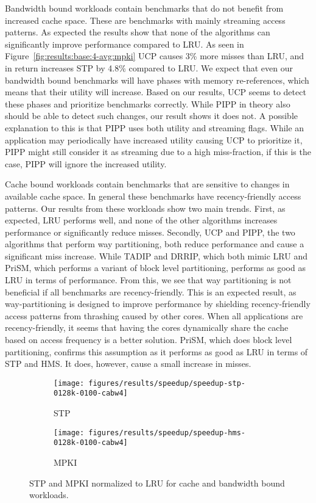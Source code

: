 Bandwidth bound workloads contain benchmarks that do not benefit from increased cache space.
These are benchmarks with mainly streaming access patterns. 
As expected the results show that none of the algorithms can significantly improve performance compared to LRU.
As seen in Figure~\ref{fig:results:base:4-avg:mpki} UCP causes 3\% more misses than LRU, and in return increases STP by 4.8\% compared to LRU.
We expect that even our bandwidth bound benchmarks will have phases with memory re-references, which means that their utility will increase.
Based on our results, UCP seems to detect these phases and prioritize benchmarks correctly.
While PIPP in theory also should be able to detect such changes, our result shows it does not.
A possible explanation to this is that PIPP uses both utility and streaming flags.
While an application may periodically have increased utility causing UCP to prioritize it, PIPP might still consider it as streaming due to a high miss-fraction, if this is the case, PIPP will ignore the increased utility.

Cache bound workloads contain benchmarks that are sensitive to changes in available cache space.
In general these benchmarks have recency-friendly access patterns.
Our results from these workloads show two main trends.
First, as expected, LRU performs well, and none of the other algorithms increases performance or significantly reduce misses.
Secondly, UCP and PIPP, the two algorithms that perform way partitioning, both reduce performance and cause a significant miss increase. 
While TADIP and DRRIP, which both mimic LRU and PriSM, which performs a variant of block level partitioning, performs as good as LRU in terms of performance.
From this, we see that way partitioning is not beneficial if all benchmarks are recency-friendly.
This is an expected result, as way-partitioning is designed to improve performance by shielding recency-friendly access patterns from thrashing caused by other cores.
When all applications are recency-friendly, it seems that having the cores dynamically share the cache based on access frequency is a better solution.
PriSM, which does block level partitioning, confirms this assumption as it performs as good as LRU in terms of STP and HMS.
It does, however, cause a small increase in misses.


\begin{figure}[th]
    \centering
    \begin{subfigure}[b]{0.5\textwidth}
        \texttt{[image: figures/results/speedup/speedup-stp-0128k-0100-cabw4]}
        \caption{STP}
        \label{fig:results:base:cabw:stp}
    \end{subfigure}%
    \begin{subfigure}[b]{0.5\textwidth}
        \texttt{[image: figures/results/speedup/speedup-hms-0128k-0100-cabw4]}
        \caption{MPKI}
        \label{fig:results:base:cabw:mpki}
    \end{subfigure}
    \caption[cabw workloads result]{STP and MPKI normalized to LRU for cache and bandwidth bound workloads.}
    \label{fig:results:base:cabw} 
\end{figure}

